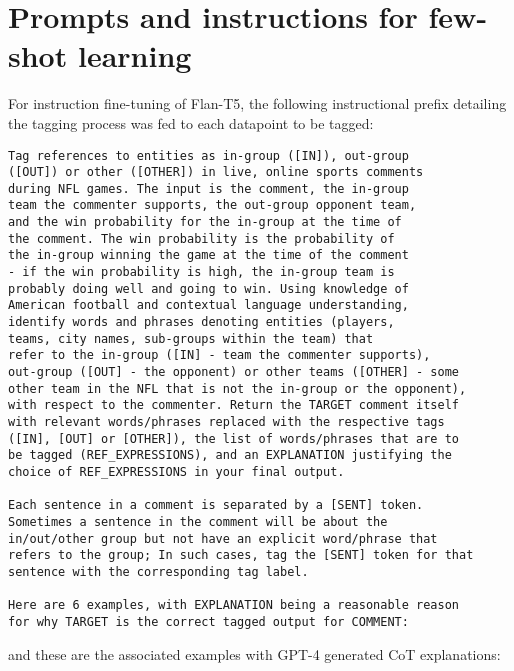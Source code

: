 \chapter{Prompts and instructions for few-shot learning}
\label{appendix:prompts}

For instruction fine-tuning of Flan-T5, the following instructional prefix detailing the tagging process was fed to each datapoint to be tagged:

\begin{verbatim}
Tag references to entities as in-group ([IN]), out-group 
([OUT]) or other ([OTHER]) in live, online sports comments 
during NFL games. The input is the comment, the in-group 
team the commenter supports, the out-group opponent team, 
and the win probability for the in-group at the time of 
the comment. The win probability is the probability of 
the in-group winning the game at the time of the comment 
- if the win probability is high, the in-group team is 
probably doing well and going to win. Using knowledge of 
American football and contextual language understanding, 
identify words and phrases denoting entities (players, 
teams, city names, sub-groups within the team) that 
refer to the in-group ([IN] - team the commenter supports),
out-group ([OUT] - the opponent) or other teams ([OTHER] - some 
other team in the NFL that is not the in-group or the opponent), 
with respect to the commenter. Return the TARGET comment itself 
with relevant words/phrases replaced with the respective tags 
([IN], [OUT] or [OTHER]), the list of words/phrases that are to 
be tagged (REF_EXPRESSIONS), and an EXPLANATION justifying the 
choice of REF_EXPRESSIONS in your final output.

Each sentence in a comment is separated by a [SENT] token. 
Sometimes a sentence in the comment will be about the 
in/out/other group but not have an explicit word/phrase that 
refers to the group; In such cases, tag the [SENT] token for that 
sentence with the corresponding tag label.

Here are 6 examples, with EXPLANATION being a reasonable reason 
for why TARGET is the correct tagged output for COMMENT:
\end{verbatim}

and these are the associated examples with GPT-4 generated CoT explanations:

